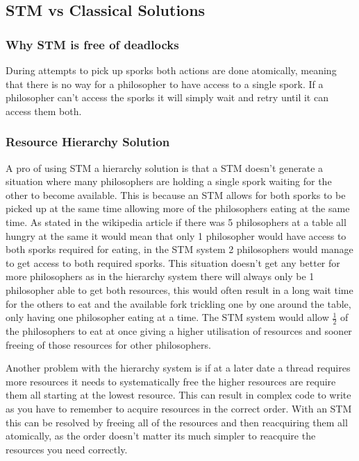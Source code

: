 \documentclass[a4paper]{article}
\begin{document}
\subsection{STM vs Classical Solutions}

\subsubsection{Why STM is free of deadlocks}
During attempts to pick up sporks both actions are done atomically, meaning that there is no way for a philosopher to have access to a single spork.
If a philosopher can't access the sporks it will simply wait and retry until it can access them both.

\subsubsection{Resource Hierarchy Solution}
A pro of using STM a hierarchy solution is that a STM doesn't generate a situation where many philosophers are holding a single spork waiting for the other to become available.
This is because an STM allows for both sporks to be picked up at the same time allowing more of the philosophers eating at the same time.
As stated in the wikipedia article if there was 5 philosophers at a table all hungry at the same it would mean that only 1 philosopher would have access to both sporks required for eating, in the STM system 2 philosophers would manage to get access to both required sporks.
This situation doesn't get any better for more philosophers as in the hierarchy system there will always only be 1 philosopher able to get both resources, this would often result in a long wait time for the others to eat and the available fork trickling one by one around the table, only having one philosopher eating at a time.
The STM system would allow \( \frac{1}{2}\) of the philosophers to eat at once giving a higher utilisation of resources and sooner freeing of those resources for other philosophers.
\par
Another problem with the hierarchy system is if at a later date a thread requires more resources it needs to systematically free the higher resources are require them all starting at the lowest resource.
This can result in complex code to write as you have to remember to acquire resources in the correct order.
With an STM this can be resolved by freeing all of the resources and then reacquiring them all atomically, as the order doesn't matter its much simpler to reacquire the resources you need correctly.
\end{document}
